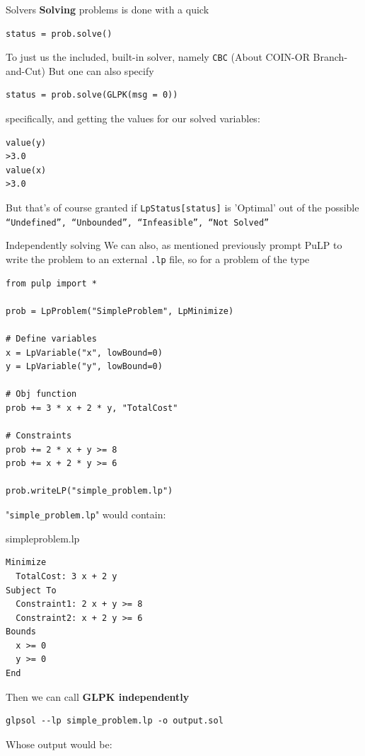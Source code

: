 \documentclass{purdue-slide}
\begin{document}
\begin{frame}[fragile]{Solvers}
	\textbf{ Solving } problems is done with a quick	
\begin{verbatim}
status = prob.solve()
\end{verbatim}
	To just us the included, built-in solver, namely \verb|CBC| (About
	COIN-OR Branch-and-Cut)
	But one can also specify
\begin{verbatim}
status = prob.solve(GLPK(msg = 0))
\end{verbatim}
	specifically, and getting the values for our solved variables:
\begin{verbatim}
value(y)
>3.0
value(x)
>3.0
\end{verbatim}
	But that's of course granted if \verb|LpStatus[status]| is 'Optimal' out of the possible \verb|“Undefined”, “Unbounded”, “Infeasible”, “Not Solved”|
\end{frame}

\begin{frame}[fragile]{Independently solving}
	We can also, as mentioned previously prompt	PuLP to write the problem to an external \verb|.lp| file, so for a problem of the type
	\begin{verbatim}
from pulp import *

prob = LpProblem("SimpleProblem", LpMinimize)

# Define variables
x = LpVariable("x", lowBound=0)
y = LpVariable("y", lowBound=0)

# Obj function
prob += 3 * x + 2 * y, "TotalCost"

# Constraints
prob += 2 * x + y >= 8
prob += x + 2 * y >= 6

prob.writeLP("simple_problem.lp")	
	\end{verbatim}
	"\verb|simple_problem.lp|" would contain:
\end{frame}

\begin{frame}[fragile]{simpleproblem.lp}
	\begin{verbatim}
Minimize
  TotalCost: 3 x + 2 y
Subject To
  Constraint1: 2 x + y >= 8
  Constraint2: x + 2 y >= 6
Bounds
  x >= 0
  y >= 0
End	
	\end{verbatim}
	Then we can call \textbf{GLPK independently}
	\begin{verbatim}
glpsol --lp simple_problem.lp -o output.sol	
	\end{verbatim}
	Whose output would be:
\end{frame}
\end{document}
